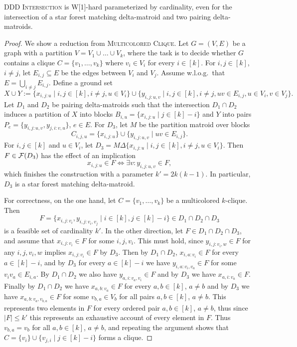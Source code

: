 \begin{theorem} \label{thm:ddd-hard}
  \textsc{DDD Intersection} is W[1]-hard parameterized by cardinality,
  even for the intersection of a star forest matching delta-matroid
  and two pairing delta-matroids. 
\end{theorem}
\begin{proof}
  We show a reduction from \textsc{Multicolored Clique}.
  Let $G=(V,E)$ be a graph with a partition $V=V_1 \cup \ldots \cup V_k$,
  where the task is to decide whether $G$ contains a clique $C=\{v_1,\ldots,v_k\}$
  where $v_i \in V_i$ for every $i \in [k]$. For $i, j \in [k]$, $i \neq j$,
  let $E_{i,j} \subseteq E$ be the edges between $V_i$ and $V_j$. 
  Assume w.l.o.g.\ that $E=\bigcup_{i \neq j} E_{i,j}$. 
  Define a ground set
  \[
    X \cup Y :=   \{x_{i,j:u} \mid i, j \in [k], i \neq j, u \in V_i\}
    \cup
    \{y_{i,j:u,v} \mid i, j \in [k], i \neq j,
    uv \in E_{i,j}, u \in V_i, v \in V_j\}.
  \]
  Let $D_1$ and $D_2$ be pairing delta-matroids
  such that the intersection $D_1 \cap D_2$ 
  induces a partition of $X$ into blocks $B_{i,u}=\{x_{i,j:u} \mid j \in [k]-i\}$
  and $Y$ into pairs $P_e=\{y_{i,j:u,v},y_{j,i:v,u}\}$, $e \in E$.
  For $D_3$, let $M$ be the partition matroid over blocks
  \[
    C_{i,j,u}=\{x_{i,j:u}\} \cup \{y_{i,j:u,v} \mid uv \in E_{i,j}\}.
  \]
  For $i, j \in [k]$ and $u \in V_i$, 
  let $D_3=M \Delta \{x_{i,j:u} \mid i, j \in [k], i \neq j, u \in V_i\}$.
  Then $F \in \mathcal F(D_3)$ has the effect of an implication
  \[
    x_{i,j:u} \in F \Leftrightarrow \exists v : y_{i,j:u,v} \in F,
  \]
  which finishes the construction with a parameter $k'=2k(k-1)$.
  In particular, $D_3$ is a star forest matching delta-matroid.

  For correctness, on the one hand, let $C=\{v_1,\ldots,v_k\}$ be a multicolored $k$-clique.
  Then
  \[
    F=\{x_{i,j:v_i}, y_{i,j:v_i,v_j}  \mid i \in [k], j \in [k] - i\}  \in D_1 \cap D_2 \cap D_3
  \]
  is a feasible set of cardinality $k'$. In the other direction,
  let $F \in D_1 \cap D_2 \cap D_3$, and assume that $x_{i,j:v_i} \in F$ 
  for some $i, j, v_i$. This must hold, since $y_{i,j:v_i,w} \in F$
  for any $i, j, v_i, w$ implies $x_{i,j:v_i} \in F$ by $D_3$. Then by
  $D_1 \cap D_2$, $x_{i,a:v_i} \in F$ for every $a \in [k]-i$,
  and by $D_3$ for every $a \in [k]-i$ we have $y_{i,a:v_i,v_a} \in F$ 
  for some $v_iv_a \in E_{i,a}$. By $D_1 \cap D_2$ we also have
  $y_{a,i:v_a,v_i} \in F$ and by $D_3$ we have $x_{a,i:v_a} \in F$.
  Finally by $D_1 \cap D_2$ we have $x_{a,b:v_a} \in F$ for every
  $a, b \in [k]$, $a \neq b$ and by $D_3$ we have $x_{a,b:v_a,v_{b,a}} \in F$
  for some $v_{b,a} \in V_b$ for all pairs $a, b \in [k]$, $a \neq b$.   
  This represents two elements in $F$ for every ordered pair $a, b \in [k]$,
  $a \neq b$, thus since $|F| \leq k'$ this represents an exhaustive
  account of every element in $F$. Thus $v_{b,a}=v_b$ for all $a, b \in [k]$, 
  $a \neq b$, and repeating the argument shows that 
  $C=\{v_i\} \cup \{v_{j,i} \mid j \in [k]-i\}$ forms a clique.
\end{proof}


